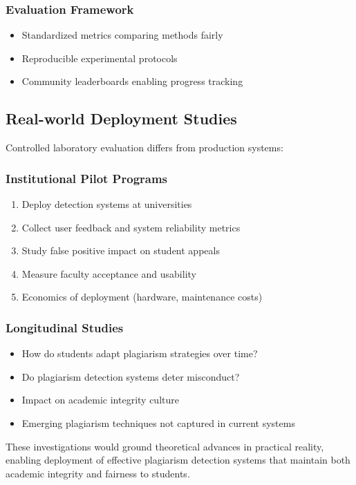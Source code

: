 \subsubsection{Evaluation Framework}

\begin{itemize}
  \item Standardized metrics comparing methods fairly
  \item Reproducible experimental protocols
  \item Community leaderboards enabling progress tracking
\end{itemize}

\subsection{Real-world Deployment Studies}

Controlled laboratory evaluation differs from production systems:

\subsubsection{Institutional Pilot Programs}

\begin{enumerate}
  \item Deploy detection systems at universities
  \item Collect user feedback and system reliability metrics
  \item Study false positive impact on student appeals
  \item Measure faculty acceptance and usability
  \item Economics of deployment (hardware, maintenance costs)
\end{enumerate}

\subsubsection{Longitudinal Studies}

\begin{itemize}
  \item How do students adapt plagiarism strategies over time?
  \item Do plagiarism detection systems deter misconduct?
  \item Impact on academic integrity culture
  \item Emerging plagiarism techniques not captured in current systems
\end{itemize}

These investigations would ground theoretical advances in practical reality, enabling deployment of effective plagiarism detection systems that maintain both academic integrity and fairness to students.
